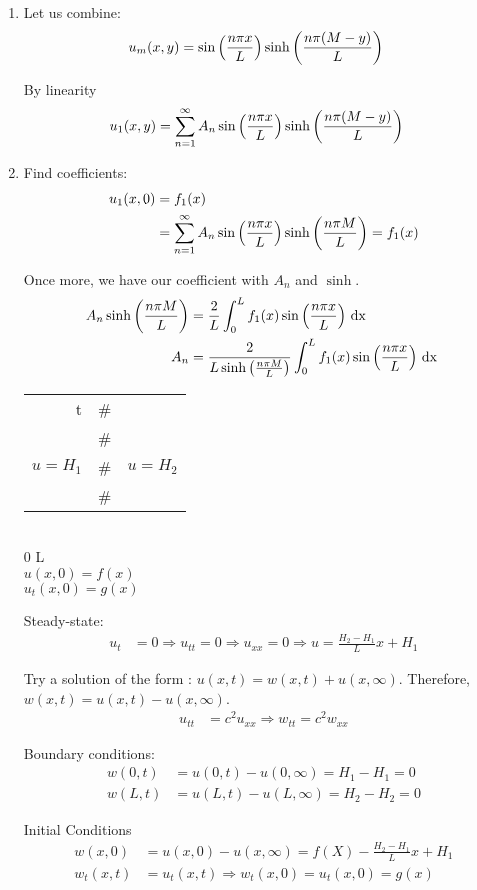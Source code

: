\begin{enumerate}
\item Let us combine:
%
\begin{align}
  u_m(x, y) & = \sin \Big( \frac{n \pi x}{L} \Big) \sinh\left( \frac{ n \pi (M - y)}{L} \right)
\end{align}

By linearity
%
\begin{align}
  u_1(x, y) & = \sum^\infty_{n = 1} A_n \sin \Big( \frac{n \pi x}{L} \Big) \sinh\left( \frac{n \pi(M -y)}{L} \right)
\end{align}

\item Find coefficients:
%
\begin{align}
  u_1(x, 0) & = f_1(x)\\
  & = \sum^\infty_{n = 1} A_n \sin \Big( \frac{n \pi x}{L} \Big) \sinh\left( \frac{n \pi M}{L} \right) = f_1(x)
\end{align}

Once more, we have our coefficient with $A_n$ and $\sinh$.
%
\begin{align}
  A_n \sinh \left( \frac{n \pi M}{L} \right) & = \frac{2}{L} \int^L_0 f_1(x) \sin \Big( \frac{n \pi x}{L} \Big) \text{ dx }\\
  A_n & = \frac{2}{L \sinh \left( \frac{n \pi M}{L} \right)} \int^L_0 f_1(x) \sin \Big( \frac{n \pi x}{L} \Big) \text{ dx }
\end{align}


\begin{center}
  \begin{tabular}{r|c|l}
    t & \# &\\
    & \# & \\
    $u = H_1$ & \# & $u = H_2$\\
    & \# &\\
    \hline
  \end{tabular}\\
  0 \quad L\\
  $u(x, 0) = f(x)$\\
  $u_t(x, 0) = g(x)$
\end{center}

Steady-state:
%
\begin{align}
  u_t & = 0 \Rightarrow u_{tt} = 0 \Rightarrow u_{xx} = 0 \Rightarrow u = \frac{H_2 - H_1}{L} x + H_1
\end{align}

Try a solution of the form : $u(x, t) = w(x, t) + u(x, \infty)$. Therefore, $w(x, t) = u(x, t) - u(x, \infty)$.
%
\begin{align}
  u_{tt} & = c^2 u_{xx} \Rightarrow w_{tt} = c^2 w_{xx}
\end{align}

Boundary conditions:
%
\begin{align}
  w(0, t) & = u(0, t) - u(0, \infty) = H_1 - H_1 = 0\\
  w(L, t) & = u(L, t) - u(L, \infty) = H_2 - H_2 = 0
\end{align}

Initial Conditions
%
\begin{align}
  w(x, 0) & = u(x, 0) - u(x, \infty) = f(X) - \frac{H_2 - H_1}{L} x + H_1\\
  w_t(x, t) & = u_t(x, t) \Rightarrow w_t(x, 0) = u_t(x, 0) = g(x)
\end{align}
\end{enumerate}

